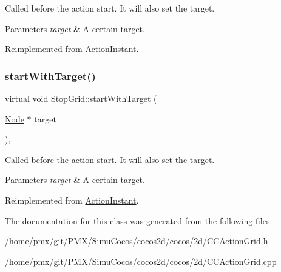 Called before the action start. It will also set the target.


\begin{DoxyParams}{Parameters}
{\em target} & A certain target. \\
\hline
\end{DoxyParams}


Reimplemented from \hyperlink{classActionInstant_a47cff49ef73e126e5e9d6c26872a9e23}{Action\+Instant}.

\mbox{\label{classStopGrid_a1fc959f156e77a97e5d49c7cad546be1}} 
\subsubsection{\texorpdfstring{start\+With\+Target()}{startWithTarget()}\hspace{0.1cm}{\footnotesize\ttfamily [2/2]}}
{\footnotesize\ttfamily virtual void Stop\+Grid\+::start\+With\+Target (\begin{DoxyParamCaption}\item[{\hyperlink{classNode}{Node} $\ast$}]{target }\end{DoxyParamCaption})\hspace{0.3cm}{\ttfamily [override]}, {\ttfamily [virtual]}}

Called before the action start. It will also set the target.


\begin{DoxyParams}{Parameters}
{\em target} & A certain target. \\
\hline
\end{DoxyParams}


Reimplemented from \hyperlink{classActionInstant_a47cff49ef73e126e5e9d6c26872a9e23}{Action\+Instant}.



The documentation for this class was generated from the following files\+:\begin{DoxyCompactItemize}
\item 
/home/pmx/git/\+P\+M\+X/\+Simu\+Cocos/cocos2d/cocos/2d/C\+C\+Action\+Grid.\+h\item 
/home/pmx/git/\+P\+M\+X/\+Simu\+Cocos/cocos2d/cocos/2d/C\+C\+Action\+Grid.\+cpp\end{DoxyCompactItemize}
